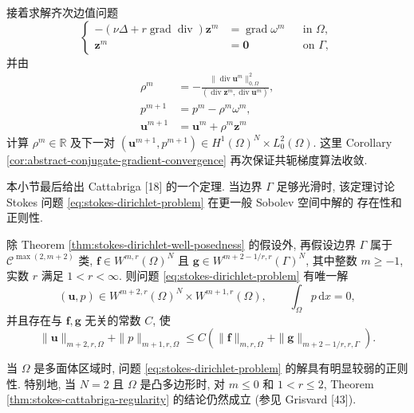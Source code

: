 接着求解齐次边值问题
\[
\left\{
\begin{aligned}
-(\nu\Delta+r\operatorname{grad}\operatorname{div})
\mathbf{z}^m
&=\operatorname{grad}\omega^m
&&\text{in }\Omega,\\
\mathbf{z}^m&=\mathbf{0}
&&\text{on }\Gamma,
\end{aligned}
\right.
\]
并由
\[
\begin{aligned}
\rho^m
&=-\frac{\|\operatorname{div}\mathbf{u}^m\|_{0,\Omega}^2}
{(\operatorname{div}\mathbf{z}^m,
\operatorname{div}\mathbf{u}^m)},\\
p^{m+1}&=p^m-\rho^m\omega^m,\\
\mathbf{u}^{m+1}&=\mathbf{u}^m+\rho^m\mathbf{z}^m
\end{aligned}
\]
计算 $\rho^m\in\mathbb{R}$ 及下一对
$(\mathbf{u}^{m+1},p^{m+1})
\in H^1(\Omega)^N\times L_0^2(\Omega)$.
这里 Corollary \ref{cor:abstract-conjugate-gradient-convergence}
再次保证共轭梯度算法收敛.

本小节最后给出 Cattabriga [18] 的一个定理.
当边界 $\Gamma$ 足够光滑时, 该定理讨论 Stokes 问题
\eqref{eq:stokes-dirichlet-problem} 在更一般 Sobolev 空间中解的
存在性和正则性.

\setcounter{statement}{3}
\begin{Theorem}\label{thm:stokes-cattabriga-regularity}
除 Theorem \ref{thm:stokes-dirichlet-well-posedness} 的假设外,
再假设边界 $\Gamma$ 属于
$\mathcal{C}^{\max(2,m+2)}$ 类,
$\mathbf{f}\in W^{m,r}(\Omega)^N$ 且
$\mathbf{g}\in W^{m+2-1/r,r}(\Gamma)^N$,
其中整数 $m\ge-1$, 实数 $r$ 满足 $1<r<\infty$.
则问题 \eqref{eq:stokes-dirichlet-problem} 有唯一解
\[
(\mathbf{u},p)\in
W^{m+2,r}(\Omega)^N\times W^{m+1,r}(\Omega),
\qquad
\int_\Omega p\,\mathrm{d}x=0,
\]
并且存在与 $\mathbf{f},\mathbf{g}$ 无关的常数 $C$, 使
\begin{equation}\label{eq:stokes-cattabriga-regularity-bound}
\|\mathbf{u}\|_{m+2,r,\Omega}
+\|p\|_{m+1,r,\Omega}
\le
C\left(
\|\mathbf{f}\|_{m,r,\Omega}
+\|\mathbf{g}\|_{m+2-1/r,r,\Gamma}
\right).
\end{equation}
\end{Theorem}

\setcounter{statement}{5}
\begin{Remark}\label{rem:stokes-polyhedral-regularity}
当 $\Omega$ 是多面体区域时, 问题
\eqref{eq:stokes-dirichlet-problem} 的解具有明显较弱的正则性.
特别地, 当 $N=2$ 且 $\Omega$ 是凸多边形时,
对 $m\le0$ 和 $1<r\le2$, Theorem
\ref{thm:stokes-cattabriga-regularity} 的结论仍然成立
(参见 Grisvard [43]).
\end{Remark}

